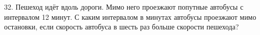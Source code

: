 32. Пешеход идёт вдоль дороги. Мимо него проезжают попутные автобусы с интервалом 12 минут. С каким интервалом в минутах автобусы проезжают мимо остановки, если скорость автобуса в шесть раз больше скорости пешехода?\\
